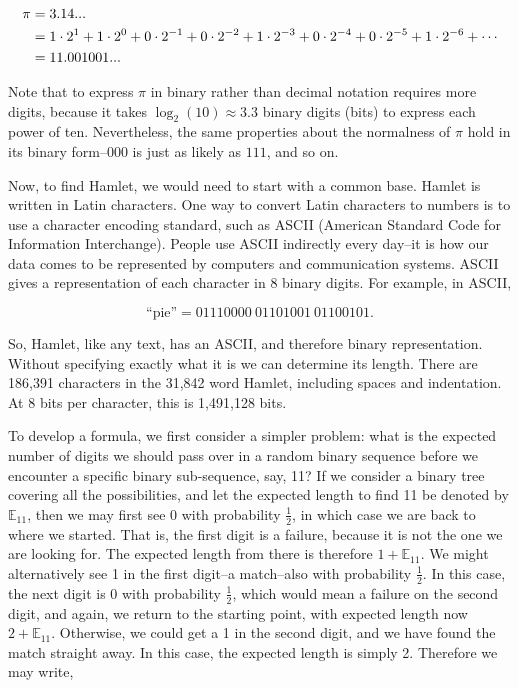 \documentclass[11pt]{amsart}
\begin{document}
\begin{align}
\pi &= 3.14... \notag \\
&= 1\cdot2^1 + 1\cdot2^0 + 0\cdot2^{-1} + 0\cdot2^{-2} + 1\cdot2^{-3} + 0\cdot2^{-4} + 0\cdot2^{-5} + 1\cdot2^{-6} + \cdots \notag \\
&= 11.001001... \notag
\end{align}

Note that to express $\pi$ in binary rather than decimal notation requires more digits, because it takes $\log_2(10) \approx 3.3$ binary digits (bits) to express each power of ten. Nevertheless, the same properties about the normalness of $\pi$ hold in its binary form--$000$ is just as likely as $111$, and so on.

Now, to find Hamlet, we would need to start with a common base. Hamlet is written in Latin characters. One way to convert Latin characters to numbers is to use a character encoding standard, such as ASCII (American Standard Code for Information Interchange). People use ASCII indirectly every day--it is how our data comes to be represented by computers and communication systems. ASCII gives a representation of each character in 8 binary digits. For example, in ASCII,

$$\text{``pie''} = 01110000 \ 01101001 \ 01100101.$$

So, Hamlet, like any text, has an ASCII, and therefore binary representation. Without specifying exactly what it is we can determine its length. There are 186,391 characters in the 31,842 word Hamlet, including spaces and indentation. At 8 bits per character, this is 1,491,128 bits.

To develop a formula, we first consider a simpler problem: what is the expected number of digits we should pass over in a random binary sequence before we encounter a specific binary sub-sequence, say, 11? If we consider a binary tree covering all the possibilities, and let the expected length to find 11 be denoted by $\mathbb{E}_{11}$, then we may first see 0 with probability $\frac{1}{2}$, in which case we are back to where we started. That is, the first digit is a failure, because it is not the one we are looking for. The expected length from there is therefore $1 + \mathbb{E}_{11}$. We might alternatively see 1 in the first digit--a match--also with probability $\frac{1}{2}$. In this case, the next digit is 0 with probability $\frac{1}{2}$, which would mean a failure on the second digit, and again, we return to the starting point, with expected length now $2 + \mathbb{E}_{11}$. Otherwise, we could get a 1 in the second digit, and we have found the match straight away. In this case, the expected length is simply 2. Therefore we may write,
\end{document}
